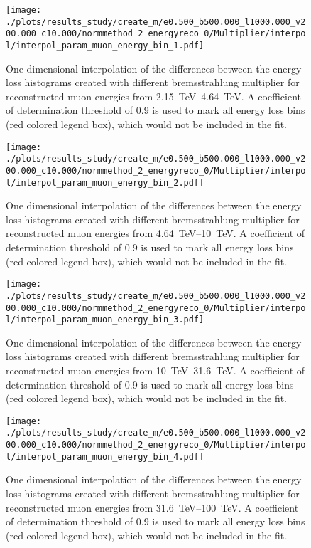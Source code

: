 \begin{figure}[H]
    \centering
    \texttt{[image: ./plots/results\_study/create\_m/e0.500\_b500.000\_l1000.000\_v200.000\_c10.000/normmethod\_2\_energyreco\_0/Multiplier/interpol/interpol\_param\_muon\_energy\_bin\_1.pdf]}
    \caption{One dimensional interpolation of the differences between the energy loss histograms created with different bremsstrahlung multiplier for reconstructed muon energies from \SIrange{2.15}{4.64}{TeV}. A coefficient of determination threshold of \num{0.9} is used to mark all energy loss bins (red colored legend box), which would not be included in the fit.}
    \label{fig:study_1d_interpol_mu1_te_high}
\end{figure}

\begin{figure}[H]
    \centering
    \texttt{[image: ./plots/results\_study/create\_m/e0.500\_b500.000\_l1000.000\_v200.000\_c10.000/normmethod\_2\_energyreco\_0/Multiplier/interpol/interpol\_param\_muon\_energy\_bin\_2.pdf]}
    \caption{One dimensional interpolation of the differences between the energy loss histograms created with different bremsstrahlung multiplier for reconstructed muon energies from \SIrange{4.64}{10}{TeV}. A coefficient of determination threshold of \num{0.9} is used to mark all energy loss bins (red colored legend box), which would not be included in the fit.}
    \label{fig:study_1d_interpol_mu2_te_high}
\end{figure}

\begin{figure}[H]
    \centering
    \texttt{[image: ./plots/results\_study/create\_m/e0.500\_b500.000\_l1000.000\_v200.000\_c10.000/normmethod\_2\_energyreco\_0/Multiplier/interpol/interpol\_param\_muon\_energy\_bin\_3.pdf]}
    \caption{One dimensional interpolation of the differences between the energy loss histograms created with different bremsstrahlung multiplier for reconstructed muon energies from \SIrange{10}{31.6}{TeV}. A coefficient of determination threshold of \num{0.9} is used to mark all energy loss bins (red colored legend box), which would not be included in the fit.}
    \label{fig:study_1d_interpol_mu3_te_high}
\end{figure}

\begin{figure}[H]
    \centering
    \texttt{[image: ./plots/results\_study/create\_m/e0.500\_b500.000\_l1000.000\_v200.000\_c10.000/normmethod\_2\_energyreco\_0/Multiplier/interpol/interpol\_param\_muon\_energy\_bin\_4.pdf]}
    \caption{One dimensional interpolation of the differences between the energy loss histograms created with different bremsstrahlung multiplier for reconstructed muon energies from \SIrange{31.6}{100}{TeV}. A coefficient of determination threshold of \num{0.9} is used to mark all energy loss bins (red colored legend box), which would not be included in the fit.}
    \label{fig:study_1d_interpol_mu4_te_high}
\end{figure}

